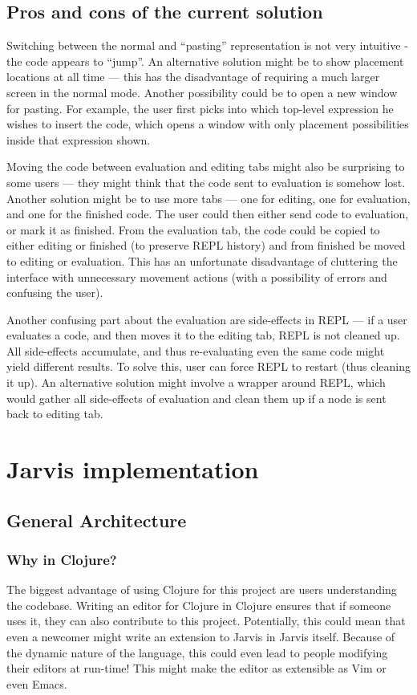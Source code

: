 \documentclass[11pt]{scrartcl}
\begin{document}
\subsection{Pros and cons of the current solution}
Switching between the normal and “pasting” representation is not very intuitive
- the code appears to “jump”.
An alternative solution might be to show placement locations at all time --- this
has the disadvantage of requiring a much larger screen in the normal mode.
Another possibility could be to open a new window for pasting.
For example, the user first picks into which top-level expression he wishes to
insert the code, which opens a window with only placement possibilities inside
that expression shown.

Moving the code between evaluation and editing tabs might also be surprising to
some users --- they might think that the code sent to evaluation is somehow lost.
Another solution might be to use more tabs --- one for editing, one for
evaluation, and one for the finished code.
The user could then either send code to evaluation, or mark it as finished.
From the evaluation tab, the code could be copied to either editing or finished
(to preserve REPL history) and from finished be moved to editing or evaluation.
This has an unfortunate disadvantage of cluttering the interface with
unnecessary movement actions (with a possibility of errors and confusing the
user).

Another confusing part about the evaluation are side-effects in REPL --- if a user
evaluates a code, and then moves it to the editing tab, REPL is not cleaned up.
All side-effects accumulate, and thus re-evaluating even the same code might
yield different results.
To solve this, user can force REPL to restart (thus cleaning it up).
An alternative solution might involve a wrapper around REPL, which would gather
all side-effects of evaluation and clean them up if a node is sent back to
editing tab.


\section{Jarvis implementation}
\subsection{General Architecture}
\subsubsection{Why in Clojure?}
The biggest advantage of using Clojure for this project are users understanding
the codebase.
Writing an editor for Clojure in Clojure ensures that if someone uses it, they
can also contribute to this project.
Potentially, this could mean that even a newcomer might write an extension to
Jarvis in Jarvis itself.
Because of the dynamic nature of the language, this could even lead to people
modifying their editors at run-time! This might make the editor as extensible as
Vim or even Emacs.
\end{document}
